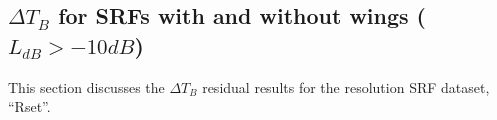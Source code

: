 %
%
%
%
%
%
\subsection{$\Delta T_B$ for SRFs with and without wings ($L_{dB} > -10dB$)}
\label{sec:rt.Rset}
This section discusses the $\Delta T_B$ residual results for the resolution SRF dataset, ``Rset''.

